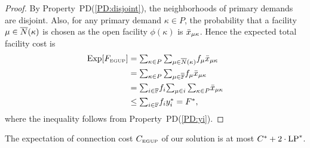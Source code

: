 \documentclass[11pt]{article}
\begin{document}
\begin{proof}
  By Property~PD(\ref{PD:disjoint}), the neighborhoods of
  primary demands are disjoint. Also, for any primary demand
  $\kappa\in P$, the probability that a facility
  $\mu\in{\overline{N}}(\kappa)$ is chosen as the open facility
  $\phi(\kappa)$ is ${\bar x}_{\mu\kappa}$. Hence the expected
  total facility cost is
%
\begin{align*}
    \mbox{\rm Exp}[F_{\mbox{\tiny\rm EGUP}}]
	&= \textstyle{\sum_{\kappa\in P}\sum_{\mu\in{\overline{N}}(\kappa)}} f_{\mu} {\bar x}_{\mu\kappa}
	\\
	&= \textstyle{\sum_{\kappa\in P}\sum_{\mu\in\overline{\mathbb{F}}}} f_{\mu} {\bar x}_{\mu\kappa} 
	\\
	&= \textstyle{\sum_{i\in\mathbb{F}}} f_i \textstyle{\sum_{\mu\in i}\sum_{\kappa\in P}} {\bar x}_{\mu\kappa} 
	\\
	&\leq \textstyle{\sum_{i\in\mathbb{F}}} f_i y_i^\ast 
	= F^\ast,
\end{align*}
%
where the inequality follows from Property~PD(\ref{PD:yi}).
\end{proof}


\begin{lemma}\label{lemma:3dist}
The expectation of connection cost $C_{\mbox{\tiny\rm EGUP}}$ of our solution
is at most  $C^\ast+2\cdot\mbox{\rm LP}^\ast$.
\end{lemma}
\end{document}
